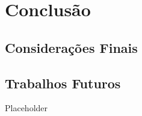 \chapter{Conclusão}
\label{chap5}

\section{Considerações Finais}
\label{section:ConsideracoesFinais}


\section{Trabalhos Futuros}
\label{section:TrabalhosFuturos}

Placeholder





